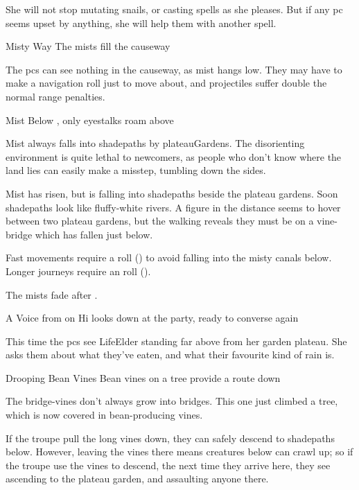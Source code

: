 She will not stop mutating snails, or casting spells as she pleases.
But if any \gls{pc} seems upset by anything, she will help them with another spell.

\LifeElder

\showStdSpells

{Misty Way}%
{The mists fill the causeway}%

The \glspl{pc} can see nothing in the causeway, as mist hangs low.
They may have to make a navigation roll just to move about, and projectiles suffer double the normal range penalties.

{Mist Below}%
{, only eyestalks roam above}%

Mist always falls into \gls{shadepaths} by \gls{plateauGardens}.
The disorienting environment is quite lethal to newcomers, as people who don't know where the land lies can easily make a misstep, tumbling down the sides.

\begin{boxtext}
  Mist has risen, but is falling into \gls{shadepaths} beside the plateau gardens.
  Soon \gls{shadepaths} look like fluffy-white rivers.
  A figure in the distance seems to hover between two plateau gardens, but the walking reveals they must be on a vine-bridge which has fallen just below.
\end{boxtext}

Fast movements require a  roll (\tn[8]) to avoid falling into the misty canals below.
Longer journeys require an  roll (\tn[10]).

The mists fade after .

{A Voice from on Hi}%
{ looks down at the party, ready to converse again}%

This time the \glspl{pc} see \gls{LifeElder} standing far above from her garden plateau.
She asks them about what they've eaten, and what their favourite kind of rain is.

{Drooping Bean Vines}%
{Bean vines on a tree provide a route down}%

The bridge-vines don't always grow into bridges.
This one just climbed a tree, which is now covered in bean-producing vines.

If the troupe pull the long vines down, they can safely descend to \gls{shadepaths} below.
However, leaving the vines there means creatures below can crawl up; so if the troupe use the vines to descend, the next time they arrive here, they see  ascending to the plateau garden, and assaulting anyone there.

